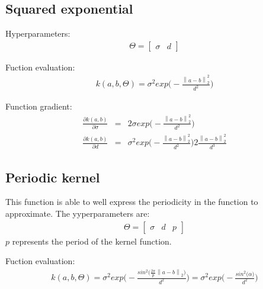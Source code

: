 \documentclass{article}
\begin{document}
\subsection{Squared exponential}

Hyperparameters:
\begin{eqnarray}
\Theta = \begin{bmatrix} \sigma & d \end{bmatrix}
\end{eqnarray}

Fuction evaluation:
\begin{eqnarray}
k(a,b,\Theta) =
\sigma^2 exp \bigg ( - \frac{\left \| a - b \right \| ^2_2}{d^2}  \bigg ) 
\end{eqnarray}

Function gradient:
\begin{eqnarray}
\frac{\partial k (a,b)}{\partial \sigma} &=& 2 \sigma exp \bigg ( - \frac{\left \| a - b \right \| ^2_2}{d^2}  \bigg ) \\
\frac{\partial k (a,b)}{\partial d} &=& \sigma^2 exp \bigg ( - \frac{\left \| a - b \right \| ^2_2}{d^2}  \bigg )
2 \frac{\left \| a - b \right \| ^2_2}{d^3}
\end{eqnarray}

\subsection{Periodic kernel}

This function is able to well express the periodicity in the function to approximate. The yyperparameters are:
\begin{eqnarray}
\Theta = \begin{bmatrix} \sigma & d & p \end{bmatrix}
\end{eqnarray}
$p$ represents the period of the kernel function.

Fuction evaluation:
\begin{eqnarray}
k(a,b,\Theta) =
\sigma^2 exp \bigg ( -\frac{sin^2 \big( \frac{2 \pi}{p} \left \| a - b \right \| _2 \big)}{d^2}  \bigg )
= \sigma^2 exp \bigg ( -\frac{sin^2 \big( \alpha \big)}{d^2}  \bigg )
\end{eqnarray}
\end{document}
